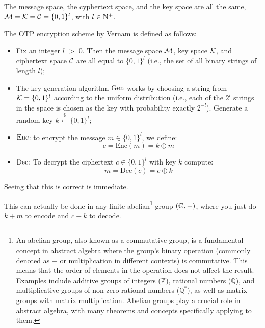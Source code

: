 \begin{tcolorbox}[colframe=black, colback=sfondo_gray, sharp corners]

\begin{construction}
	The message space, the cyphertext space, and the key space are all the same, \ie $\mathcal{M} = \mathcal{K} = \mathcal{C} = \{0,1\}^{l}$, with $l \in \mathbb{N}^{+}$.

	The \acl{OTP} encryption scheme by Vernam is defined as follows:
	
	\begin{itemize}
		\item Fix an integer $l$ $>$ 0. Then the message space $\mathcal{M}$, key space $\mathcal{K}$, and ciphertext space $\mathcal{C}$ are all equal to $\{0, 1\}^l$ (i.e., the set of all binary strings of length $l$);
		\item The key-generation algorithm $\mathrm{Gen}$ works by choosing a string from $\mathcal{K} = \{0, 1\}^l$ according to the uniform distribution (i.e., each of the $2^l$ strings in the space is chosen as the key with probability exactly $2^{-l}$). Generate a random key $k \overset{\$}{\leftarrow} \{0,1\}^l$;
		\item $\mathrm{Enc}$: to encrypt the message \( m \in \{0, 1\}^l \), we define:
		\begin{equation*}
			c = \text{Enc}(m) = k \oplus m
		\end{equation*}
		\item $\mathrm{Dec}$: To decrypt the ciphertext $c \in \{0, 1\}^l$ with key $k$ compute:
		\begin{equation*}
			m = \text{Dec}(c) = c \oplus k
		\end{equation*}
	\end{itemize}
\end{construction}
\end{tcolorbox}
Seeing that this is correct is immediate.

This can actually be done in any finite abelian\footnote{An abelian group, also known as a commutative group, is a fundamental concept in abstract algebra where the group's binary operation (commonly denoted as \(+\) or multiplication in different contexts) is commutative. This means that the order of elements in the operation does not affect the result. Examples include additive groups of integers (\(\mathbb{Z}\)), rational numbers (\(\mathbb{Q}\)), and multiplicative groups of non-zero rational numbers (\(\mathbb{Q}^*\)), as well as matrix groups with matrix multiplication. Abelian groups play a crucial role in abstract algebra, with many theorems and concepts specifically applying to them.
} group $(\mathbb{G}, +)$, where you just do $k + m$ to encode and $c - k$ to decode.


